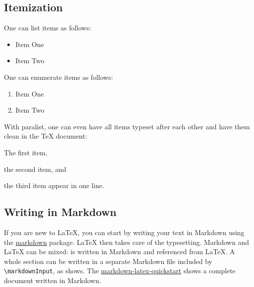 \subsection{Itemization}

One can list items as follows:

\begin{ltgexample}
\begin{itemize}
  \item Item One
  \item Item Two
\end{itemize}
\end{ltgexample}


One can enumerate items as follows:

\begin{ltgexample}
\begin{enumerate}
  \item Item One
  \item Item Two
\end{enumerate}
\end{ltgexample}


With paralist, one can even have all items typeset after each other and have them clean in the TeX document:

\begin{ltgexample}
\begin{inparaenum}
  \item The first item,
  \item the second item, and
  \item the third item appear in one line.
\end{inparaenum}
\end{ltgexample}

\subsection{Writing in Markdown}\label{sec:markdown}

\ifluatex
  If you are new to \LaTeX{}, you can start by writing your text in Markdown using the \href{https://ctan.org/pkg/markdown}{markdown} package.
  \LaTeX{} then takes care of the typesetting.
  Markdown and \LaTeX{} can be mixed:
   is written in Markdown and referenced from \LaTeX{}.
  A whole section can be written in a separate Markdown file included by \verb|\markdownInput|, as  shows.
  The \href{https://github.com/latextemplates/markdown-latex-quickstart}{markdown-latex-quickstart} shows a complete document written in Markdown.

